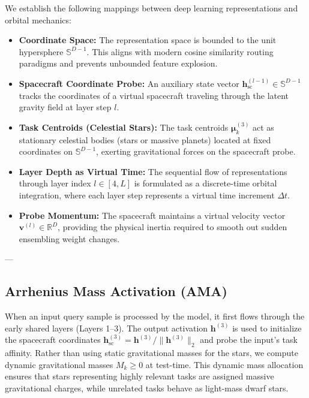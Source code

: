 We establish the following mappings between deep learning representations and orbital mechanics:
\begin{itemize}
    \item \textbf{Coordinate Space: } The representation space is bounded to the unit hypersphere $\mathbb{S}^{D-1}$. This aligns with modern cosine similarity routing paradigms and prevents unbounded feature explosion.
    \item \textbf{Spacecraft Coordinate Probe: } An auxiliary state vector $\mathbf{h}_{\text{sc}}^{(l-1)} \in \mathbb{S}^{D-1}$ tracks the coordinates of a virtual spacecraft traveling through the latent gravity field at layer step $l$.
    \item \textbf{Task Centroids (Celestial Stars): } The task centroids $\boldsymbol{\mu}_k^{(3)}$ act as stationary celestial bodies (stars or massive planets) located at fixed coordinates on $\mathbb{S}^{D-1}$, exerting gravitational forces on the spacecraft probe.
    \item \textbf{Layer Depth as Virtual Time: } The sequential flow of representations through layer index $l \in [4, L]$ is formulated as a discrete-time orbital integration, where each layer step represents a virtual time increment $\Delta t$.
    \item \textbf{Probe Momentum: } The spacecraft maintains a virtual velocity vector $\mathbf{v}^{(l)} \in \mathbb{R}^D$, providing the physical inertia required to smooth out sudden ensembling weight changes.
\end{itemize}

---

\vspace{-5pt}
\subsection{Arrhenius Mass Activation (AMA)}
When an input query sample is processed by the model, it first flows through the early shared layers (Layers 1--3). The output activation $\mathbf{h}^{(3)}$ is used to initialize the spacecraft coordinates $\mathbf{h}_{\text{sc}}^{(3)} = \mathbf{h}^{(3)} / \|\mathbf{h}^{(3)}\|_2$ and probe the input's task affinity. Rather than using static gravitational masses for the stars, we compute dynamic gravitational masses $M_k \ge 0$ at test-time. This dynamic mass allocation ensures that stars representing highly relevant tasks are assigned massive gravitational charges, while unrelated tasks behave as light-mass dwarf stars.

